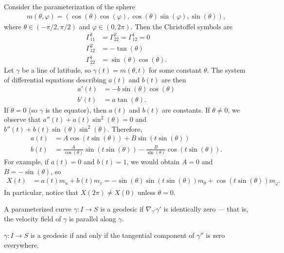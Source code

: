 \begin{exmp}
    Consider the parameterization of the sphere
    \begin{align*}
        m(\theta, \varphi) = (\cos(\theta)\cos(\varphi), \cos(\theta)\sin(\varphi), \sin(\theta)),
    \end{align*}
    where $\theta \in (-\pi/2, \pi/2)$ and $\varphi \in (0, 2\pi)$. Then the Christoffel symbols are
    \begin{align*}
        \Gamma_{11}^{k} &= \Gamma_{22}^{2} = \Gamma_{12}^{1} = 0 \\
        \Gamma_{12}^{2} &= -\tan(\theta) \\
        \Gamma_{22}^{1} &= \sin(\theta)\cos(\theta).
    \end{align*}
    Let $\gamma$ be a line of latitude, so $\gamma(t) = m(\theta, t)$ for some constant $\theta$. The system of differential equations describing $a(t)$ and $b(t)$ are then
    \begin{align*}
        a'(t) &= -b\sin(\theta)\cos(\theta) \\
        b'(t) &= a\tan(\theta).
    \end{align*}
    If $\theta = 0$ (so $\gamma$ is the equator), then $a(t)$ and $b(t)$ are constants. If $\theta \neq 0$, we observe that $a''(t) + a(t)\sin^2(\theta) = 0$ and $b''(t) + b(t)\sin(\theta)\sin^2(\theta)$. Therefore,
    \begin{align*}
        a(t) &= A\cos(t\sin(\theta)) + B\sin(t\sin(\theta)) \\
        b(t) &= \frac{A}{\cos(\theta)}\sin(t\sin(\theta)) -\frac{B}{\sin(\theta)}\cos(t\sin(\theta)).
    \end{align*}
    For example, if $a(t) = 0$ and $b(t) = 1$, we would obtain $A = 0$ and $B = -\sin(\theta)$, so
    \begin{align*}
        X(t) &= a(t)m_u + b(t)m_v = -\sin(\theta)\sin(t\sin(\theta))m_{\theta} + \cos(t\sin(\theta))m_{\varphi}.
    \end{align*}
    In particular, notice that $X(2\pi) \neq X(0)$ unless $\theta = 0$.
\end{exmp}

\begin{defn}
    A parameterized curve $\gamma: I \to S$ is a geodesic if $\nabla_{\gamma'}\gamma'$ is identically zero --- that is, the velocity field of $\gamma$ is parallel along $\gamma$.
\end{defn}

\begin{prop}\label{prop:geodesic-iff-no-tangential-acceleration}
    $\gamma: I \to S$ is a geodesic if and only if the tangential component of $\gamma''$ is zero everywhere.
\end{prop}

